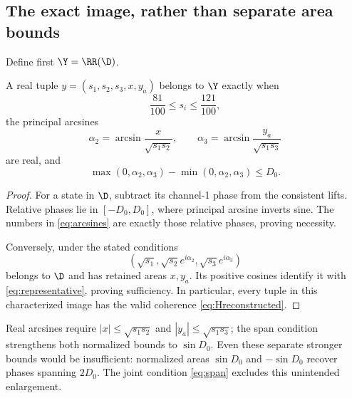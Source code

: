 \subsection{The exact image, rather than separate area bounds}
Define first \(\Y=\RR(\D)\).

\begin{proposition}\label{prop:image}
A real tuple \(y=(s_1,s_2,s_3,x,y_a)\) belongs to \(\Y\) exactly when
\begin{equation}
\frac{81}{100}\le s_i\le\frac{121}{100},
\label{eq:sinterval}
\end{equation}
the principal arcsines
\begin{equation}
\alpha_2=\arcsin\frac{x}{\sqrt{s_1s_2}},\qquad
\alpha_3=\arcsin\frac{y_a}{\sqrt{s_1s_3}}
\label{eq:arcsines}
\end{equation}
are real, and
\begin{equation}
\boxed{\max(0,\alpha_2,\alpha_3)-\min(0,\alpha_2,\alpha_3)\le D_0.}
\label{eq:span}
\end{equation}
\end{proposition}
\begin{proof}
For a state in \(\D\), subtract its channel-1 phase from the consistent lifts. Relative phases lie in \([-D_0,D_0]\), where principal arcsine inverts sine. The numbers in \eqref{eq:arcsines} are exactly those relative phases, proving necessity.

Conversely, under the stated conditions
\[
(\sqrt{s_1},\sqrt{s_2}e^{i\alpha_2},\sqrt{s_3}e^{i\alpha_3})
\]
belongs to \(\D\) and has retained areas \(x,y_a\). Its positive cosines identify it with \eqref{eq:representative}, proving sufficiency. In particular, every tuple in this characterized image has the valid coherence \eqref{eq:Hreconstructed}.
\end{proof}

Real arcsines require \(|x|\le\sqrt{s_1s_2}\) and \(|y_a|\le\sqrt{s_1s_3}\); the span condition strengthens both normalized bounds to \(\sin D_0\). Even these separate stronger bounds would be insufficient: normalized areas \(\sin D_0\) and \(-\sin D_0\) recover phases spanning \(2D_0\). The joint condition \eqref{eq:span} excludes this unintended enlargement.

